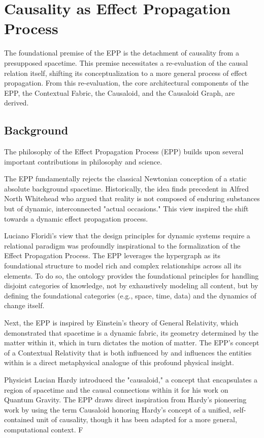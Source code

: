 \section{Causality as Effect Propagation Process}
\label{sec:epp}

The foundational premise of the EPP is the detachment of causality from a presupposed spacetime. This premise necessitates a re-evaluation of the causal relation itself, shifting its conceptualization to a more general process of effect propagation. From this re-evaluation, the core architectural
components of the EPP, the Contextual Fabric, the Causaloid, and the Causaloid Graph, are derived.

\subsection{Background}
\label{sec:epp_background}

The philosophy of the Effect Propagation Process (EPP) builds upon several important contributions in philosophy and science.

The EPP fundamentally rejects the classical Newtonian conception of a static absolute background spacetime. Historically, the idea finds precedent in Alfred North Whitehead who argued that reality is not composed of enduring substances but of dynamic, interconnected "actual occasions." This view inspired the shift towards a dynamic effect propagation process.

Luciano Floridi's view that the design principles for dynamic systems require a relational paradigm was profoundly inspirational to the formalization of the Effect Propagation Process. The EPP leverages the hypergraph as its foundational structure to model rich and complex relationships across all its elements. To do so, the ontology provides the foundational principles for handling disjoint categories of knowledge, not by exhaustively modeling all content, but by defining the foundational categories (e.g., space, time, data) and the dynamics of change itself.

Next, the EPP is inspired by Einstein's theory of General Relativity, which demonstrated that spacetime is a dynamic fabric, its geometry determined by the matter within it, which in turn dictates the motion of matter. The EPP's concept of a Contextual Relativity that is both influenced by and influences the entities within is a direct metaphysical analogue of this profound physical insight.

Physicist Lucian Hardy introduced the "causaloid," a concept that encapsulates a region of spacetime and the causal connections within it for his work on Quantum Gravity. The EPP draws direct inspiration from Hardy’s pioneering work by using the term Causaloid honoring Hardy's concept of a unified, self-contained unit of causality, though it has been adapted for a more general, computational context. F


